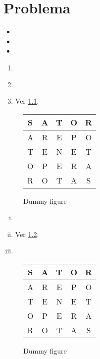 \chapter{Problema}
\lipsum[11-15] \cite[Ver][pág.1250]{beile2007ilas}
\begin{itemize}
\item \lipsum[1][1]
\item \lipsum[1][2]
\item \lipsum[1][3]
\end{itemize}

\lipsum[16-17]
\begin{enumerate}
\item \lipsum[2][1] \parencite[Ver][]{boh2016development}
\item \lipsum[2][2]
\item \lipsum[2][3] Ver \ref{fig:dummyfigure1}.
\end{enumerate}

\begin{figure}[htbp]
	\centering
	\begin{tabular}{|c|c|c|c|c|} \hline
        S & A & T & O & R\\ \hline
        A & R & E & P & O\\ \hline
        T & E & N & E & T\\ \hline
        O & P & E & R & A\\ \hline
        R & O & T & A & S\\ \hline
    \end{tabular}
    
    \caption{Dummy figure}
    \label{fig:dummyfigure1}
\end{figure}

\lipsum[18]
\begin{enumerate}[i)]
\item \lipsum[3][1]
\item \lipsum[3][2] Ver \ref{fig:dummyfigure2}.
\item \lipsum[3][3] \parencite[][pág. 75]{bruce1997seven}
\end{enumerate}

\begin{figure}[htbp]
	\centering
	\begin{tabular}{|c|c|c|c|c|} \hline
        S & A & T & O & R\\ \hline
        A & R & E & P & O\\ \hline
        T & E & N & E & T\\ \hline
        O & P & E & R & A\\ \hline
        R & O & T & A & S\\ \hline
    \end{tabular}
    
    \caption{Dummy figure}
    \label{fig:dummyfigure2}
\end{figure}

